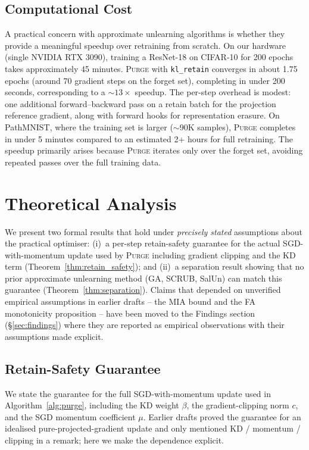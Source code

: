 \documentclass{article}
\newcommand{\ours}{\textsc{Purge}}
\newcommand{\klr}{\texttt{kl\_retain}}
\newcommand{\new}[1]{{\color{orange}#1}}
\begin{document}
\subsection{Computational Cost}\label{sec:cost}

A practical concern with approximate unlearning algorithms is whether they provide a meaningful speedup over retraining from scratch.
On our hardware (single NVIDIA RTX 3090), training a ResNet-18 on CIFAR-10 for 200 epochs takes approximately 45 minutes.
\ours{} with \klr{} converges in about 1.75 epochs (around 70 gradient steps on the forget set), completing in under 200 seconds, corresponding to a $\sim 13\times$ speedup.
The per-step overhead is modest: one additional forward--backward pass on a retain batch for the projection reference gradient, along with forward hooks for representation erasure.
On PathMNIST, where the training set is larger ($\sim$90K samples), \ours{} completes in under 5 minutes compared to an estimated 2+ hours for full retraining.
The speedup primarily arises because \ours{} iterates only over the forget set, avoiding repeated passes over the full training data.

\section{Theoretical Analysis}\label{sec:theory}

\new{We present two formal results that hold under \emph{precisely stated} assumptions about the practical optimiser: (i)~a per-step retain-safety guarantee for the actual SGD-with-momentum update used by \ours{} including gradient clipping and the KD term (Theorem~\ref{thm:retain_safety}); and (ii)~a separation result showing that no prior approximate unlearning method (GA, SCRUB, SalUn) can match this guarantee (Theorem~\ref{thm:separation}). Claims that depended on unverified empirical assumptions in earlier drafts -- the MIA bound and the FA monotonicity proposition -- have been moved to the Findings section (\S\ref{sec:findings}) where they are reported as empirical observations with their assumptions made explicit.}

\subsection{Retain-Safety Guarantee}

\new{We state the guarantee for the full SGD-with-momentum update used in Algorithm~\ref{alg:purge}, including the KD weight $\beta$, the gradient-clipping norm $c$, and the SGD momentum coefficient $\mu$. Earlier drafts proved the guarantee for an idealised pure-projected-gradient update and only mentioned KD / momentum / clipping in a remark; here we make the dependence explicit.}
\end{document}
